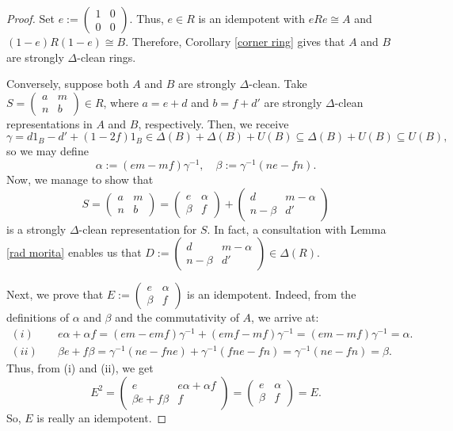 \documentclass[12pt]{amsart}
\theoremstyle{definition}
\begin{document}
\begin{proof}
Set $e:=\begin{pmatrix}
1 & 0\\
0 & 0
\end{pmatrix}$. Thus, $e \in R$ is an idempotent with $eRe \cong A$ and $(1-e)R(1-e) \cong B$. Therefore, Corollary \ref{corner ring} gives that $A$ and $B$ are strongly $\Delta$-clean rings.

Conversely, suppose both $A$ and $B$ are strongly $\Delta$-clean. Take $S=\begin{pmatrix}
a & m\\
n & b
\end{pmatrix} \in R$, where $a=e+d$ and $b=f+d'$ are strongly $\Delta$-clean representations in $A$ and $B$, respectively. Then, we receive
\[
\gamma =d1_B -d' +(1-2f)1_B \in \Delta(B)+\Delta(B)+U(B) \subseteq \Delta(B)+U(B) \subseteq U(B),
\]
so we may define
\[
\alpha := (em-mf)\gamma^{-1}, \quad \beta := \gamma^{-1} (ne-fn).
\]
Now, we manage to show that
\[
S=\begin{pmatrix}
a & m\\
n & b
\end{pmatrix} =\begin{pmatrix}
e & \alpha\\
\beta & f
\end{pmatrix} +\begin{pmatrix}
d & m-\alpha\\
n-\beta & d'
\end{pmatrix}
\]
is a strongly $\Delta$-clean representation for $S$. In fact, a consultation with Lemma \ref{rad morita} enables us that $D :=\begin{pmatrix}
d & m-\alpha\\
n-\beta & d'
\end{pmatrix} \in \Delta(R)$.

Next, we prove that $E :=\begin{pmatrix}
e & \alpha\\
\beta & f
\end{pmatrix}$ is an idempotent. Indeed, from the definitions of $\alpha$ and $\beta$ and the commutativity of $A$, we arrive at:
\begin{align*}
(i) & \quad e\alpha +\alpha f=(em-emf)\gamma^{-1}+(emf-mf)\gamma^{-1}=(em-mf)\gamma^{-1}=\alpha. \\
(ii) & \quad \beta e+f\beta=\gamma^{-1} (ne-fne)+\gamma^{-1} (fne-fn)=\gamma^{-1} (ne-fn)=\beta.
\end{align*}
Thus, from (i) and (ii), we get
\[
E^2=\begin{pmatrix}
e & e\alpha +\alpha f\\
\beta e+f\beta & f
\end{pmatrix}= \begin{pmatrix}
e & \alpha\\
\beta & f
\end{pmatrix} =E.
\]
So, $E$ is really an idempotent.


\end{proof}
\end{document}
